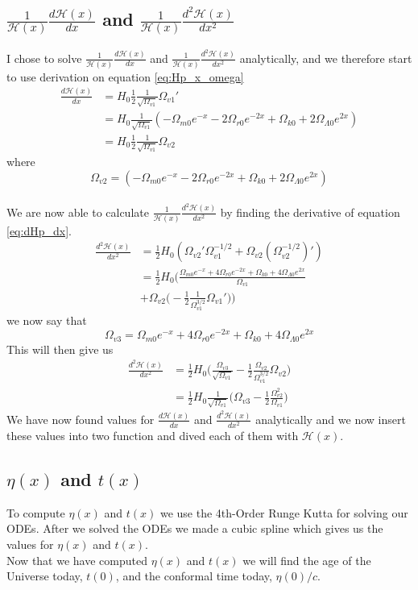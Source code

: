 \documentclass{article}
\begin{document}
\begin{multicols}{2}
\subsection{$\frac{1}{\mathcal{H}(x)}\frac{d\mathcal{H}(x)}{dx}$ and $\frac{1}{\mathcal{H}(x)}\frac{d^2\mathcal{H}(x)}{dx^2}$}
I chose to solve $\frac{1}{\mathcal{H}(x)}\frac{d\mathcal{H}(x)}{dx}$ and $\frac{1}{\mathcal{H}(x)}\frac{d^2\mathcal{H}(x)}{dx^2}$ analytically, and we therefore start to use derivation on equation \eqref{eq:Hp_x_omega}
\begin{align}
    \frac{d\mathcal{H}(x)}{dx}&=H_0\frac{1}{2}\frac{1}{\sqrt{\Omega_{v1}}}\Omega_{v1}'\\
    &=H_0\frac{1}{\sqrt{\Omega_{v1}}}(-\Omega_{m0}e^{-x}-2\Omega_{r0}e^{-2x}+\Omega_{k0}+2\Omega_{\Lambda0}e^{2x})\\
    &=H_0\frac{1}{2}\frac{1}{\sqrt{\Omega_{v1}}}\Omega_{v2} \label{eq:dHp_dx}
\end{align}
where $$\Omega_{v2}=(-\Omega_{m0}e^{-x}-2\Omega_{r0}e^{-2x}+\Omega_{k0}+2\Omega_{\Lambda0}e^{2x})$$\\
We are now able to calculate $\frac{1}{\mathcal{H}(x)}\frac{d^2\mathcal{H}(x)}{dx^2}$ by finding the derivative of equation \eqref{eq:dHp_dx}.
\begin{align}
   \frac{d^2\mathcal{H}(x)}{dx^2}&=\frac{1}{2}H_0(\Omega_{v2}'\Omega_{v1}^{-1/2}+\Omega_{v2}(\Omega_{v2}^{-1/2})' )\\
   &=\frac{1}{2}H_0\bigg(\frac{\Omega_{m0}e^{-x}+4\Omega_{r0}e^{-2x}+\Omega_{k0}+4\Omega_{\Lambda0}e^{2x}}{\Omega_{v1}}\nonumber\\&+\Omega_{v2}\bigg(-\frac{1}{2}\frac{1}{\Omega_{v1}^{3/2}}\Omega_{v1}'\bigg)\bigg)
\end{align}
we now say that $$\Omega_{v3}=\Omega_{m0}e^{-x}+4\Omega_{r0}e^{-2x}+\Omega_{k0}+4\Omega_{\Lambda0}e^{2x}$$ 
This will then give us
\begin{align}
    \frac{d^2\mathcal{H}(x)}{dx^2}&=\frac{1}{2}H_0\bigg(\frac{\Omega_{v3}}{\sqrt{\Omega_{v1}}}-\frac{1}{2}\frac{\Omega_{v2}}{{\Omega_{v1}^{3/2}}}\Omega_{v2}\bigg)\\
    &=\frac{1}{2}H_0\frac{1}{\sqrt{\Omega_{v1}}}\bigg(\Omega_{v3}-\frac{1}{2}\frac{\Omega_{v2}^2}{\Omega_{v1}}\bigg)
\end{align}
We have now found values for $\frac{d\mathcal{H}(x)}{dx}$ and $\frac{d^2\mathcal{H}(x)}{dx^2}$ analytically and we now insert these values into two function and dived each of them with $\mathcal{H}(x)$.\\
\subsection{$\eta(x)$ and $t(x)$}
To compute $\eta(x)$ and $t(x)$ we use the 4th-Order Runge Kutta for solving our ODEs. After we solved the ODEs we made a cubic spline which gives us the values for $\eta(x)$ and $t(x)$.\\
Now that we have computed $\eta(x)$ and $t(x)$ we will find the age of the Universe today, $t(0)$, and the conformal time today, $\eta(0)/c$.

\end{multicols}
\end{document}
